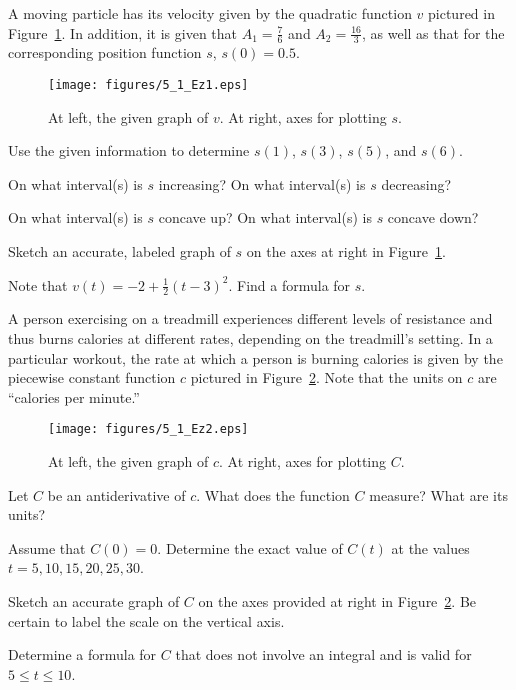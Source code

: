 \begin{exercises} 
  \item A moving particle has its velocity given by the quadratic function $v$ pictured in Figure~\ref{F:5.1.Ez1}.  In addition, it is given that $A_1 = \frac{7}{6}$ and $A_2 = \frac{16}{3}$, as well as that for the corresponding position function $s$, $s(0) = 0.5$.
  \begin{figure}[h]
\begin{center}
\texttt{[image: figures/5\_1\_Ez1.eps]}
\caption{At left, the given graph of $v$.  At right, axes for plotting $s$.} \label{F:5.1.Ez1}
\end{center}
\end{figure}
	\ba
		\item Use the given information to determine $s(1)$, $s(3)$, $s(5)$, and $s(6)$.
		\item On what interval(s) is $s$ increasing?  On what interval(s) is $s$ decreasing?
		\item On what interval(s) is $s$ concave up?  On what interval(s) is $s$ concave down?
		\item Sketch an accurate, labeled graph of $s$ on the axes at right in Figure~\ref{F:5.1.Ez1}.
		\item Note that $v(t) = -2 + \frac{1}{2}(t-3)^2$.  Find a formula for $s$.
	\ea
	
  \item A person exercising on a treadmill experiences different levels of resistance and thus burns calories at different rates, depending on the treadmill's setting.  In a particular workout, the rate at which a person is burning calories is given by the piecewise constant function $c$ pictured in Figure~\ref{F:5.1.Ez2}.  Note that the units on $c$ are ``calories per minute.''
  \begin{figure}[h]
\begin{center}
\texttt{[image: figures/5\_1\_Ez2.eps]}
\caption{At left, the given graph of $c$.  At right, axes for plotting $C$.} \label{F:5.1.Ez2}
\end{center}
\end{figure}
	\ba
		\item Let $C$ be an antiderivative of $c$.  What does the function $C$ measure?  What are its units?
		\item Assume that $C(0) = 0$.  Determine the exact value of $C(t)$ at the values $t = 5, 10, 15, 20, 25, 30$.
		\item Sketch an accurate graph of $C$ on the axes provided at right in Figure~\ref{F:5.1.Ez2}.  Be certain to label the scale on the vertical axis.
		\item Determine a formula for $C$ that does not involve an integral and is valid for $5 \le t \le 10$.
	\ea


\end{exercises}
